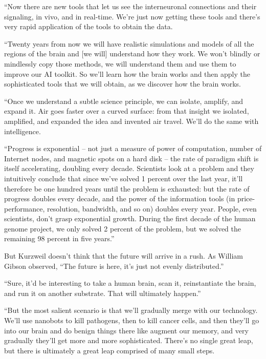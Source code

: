 ``Now there are new tools that let us see the interneuronal
connections and their signaling, in vivo, and in real-time. We're
just now getting these tools and there's very rapid application of
the tools to obtain the data.

``Twenty years from now we will have realistic simulations and
models of all the regions of the brain and [we will] understand how
they work. We won't blindly or mindlessly copy those methods, we
will understand them and use them to improve our AI toolkit. So
we'll learn how the brain works and then apply the sophisticated
tools that we will obtain, as we discover how the brain works.

``Once we understand a subtle science principle, we can isolate,
amplify, and expand it. Air goes faster over a curved surface: from
that insight we isolated, amplified, and expanded the idea and
invented air travel. We'll do the same with intelligence.

``Progress is exponential -- not just a measure of power of
computation, number of Internet nodes, and magnetic spots on a hard
disk -- the rate of paradigm shift is itself accelerating, doubling
every decade. Scientists look at a problem and they intuitively
conclude that since we've solved 1 percent over the last year,
it'll therefore be one hundred years until the problem is
exhausted: but the rate of progress doubles every decade, and the
power of the information tools (in price-performance, resolution,
bandwidth, and so on) doubles every year. People, even scientists,
don't grasp exponential growth. During the first decade of the
human genome project, we only solved 2 percent of the problem, but
we solved the remaining 98 percent in five years.''

But Kurzweil doesn't think that the future will arrive in a rush.
As William Gibson observed, ``The future is here, it's just not
evenly distributed.''

``Sure, it'd be interesting to take a human brain, scan it,
reinstantiate the brain, and run it on another substrate. That will
ultimately happen.''

``But the most salient scenario is that we'll gradually merge with
our technology. We'll use nanobots to kill pathogens, then to kill
cancer cells, and then they'll go into our brain and do benign
things there like augment our memory, and very gradually they'll
get more and more sophisticated. There's no single great leap, but
there is ultimately a great leap comprised of many small steps.

